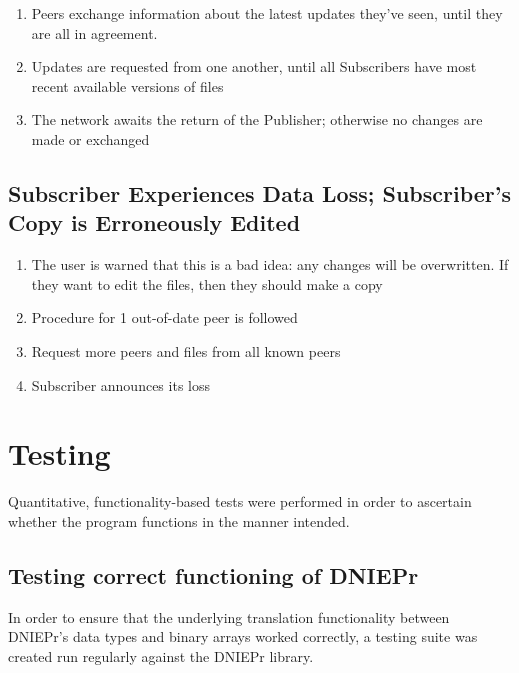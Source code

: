 \documentclass[12pt,a4paper,]{adreport}
\begin{document}
\begin{enumerate}
\def\labelenumi{\arabic{enumi}.}
\itemsep1pt\parskip0pt
\item
  Peers exchange information about the latest updates they've seen,
  until they are all in agreement.
\item
  Updates are requested from one another, until all Subscribers have
  most recent available versions of files
\item
  The network awaits the return of the Publisher; otherwise no changes
  are made or exchanged
\end{enumerate}

\section{Subscriber Experiences Data Loss; Subscriber's Copy is
Erroneously
Edited}\label{subscriber-experiences-data-loss-subscribers-copy-is-erroneously-edited}

\begin{enumerate}
\def\labelenumi{\arabic{enumi}.}
\itemsep1pt\parskip0pt
\item
  The user is warned that this is a bad idea: any changes will be
  overwritten. If they want to edit the files, then they should make a
  copy
\item
  Procedure for 1 out-of-date peer is followed
\item
  Request more peers and files from all known peers
\item
  Subscriber announces its loss
\end{enumerate}

\chapter{Testing}\label{testing}

Quantitative, functionality-based tests were performed in order to
ascertain whether the program functions in the manner intended.

\section{Testing correct functioning of
DNIEPr}\label{testing-correct-functioning-of-dniepr}

In order to ensure that the underlying translation functionality between
DNIEPr's data types and binary arrays worked correctly, a testing suite
was created run regularly against the DNIEPr library.
\end{document}
